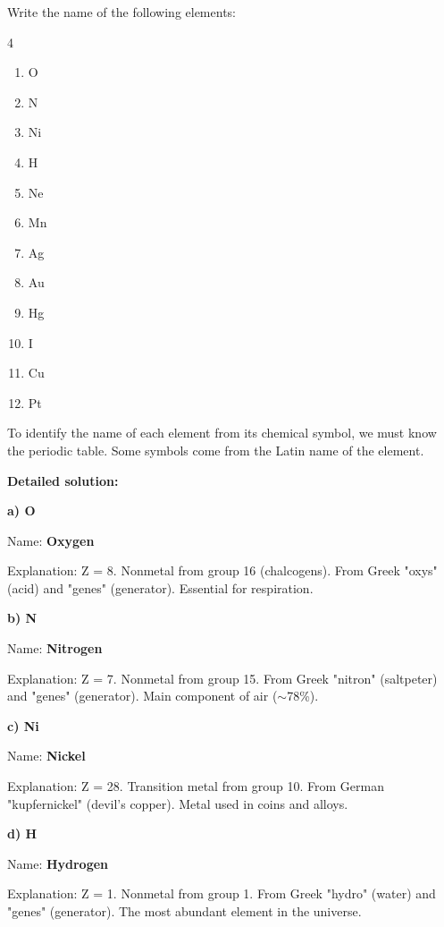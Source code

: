 \begin{exercise}
    Write the name of the following elements:
    \begin{multicols}{4}
        \begin{enumerate}[label=\letraminuscula]
        \item O
        \item N
        \item Ni
        \item H
        \item Ne
        \item Mn
        \item Ag
        \item Au
        \item Hg
        \item I
        \item Cu
        \item Pt
        \end{enumerate}
    \end{multicols}
    \begin{solu}
        To identify the name of each element from its chemical symbol, we must know the periodic table. Some symbols come from the Latin name of the element.

        \textbf{Detailed solution:}

        \textbf{a) O}

        Name: \textbf{Oxygen}

        Explanation: Z = 8. Nonmetal from group 16 (chalcogens). From Greek "oxys" (acid) and "genes" (generator). Essential for respiration.

        \textbf{b) N}

        Name: \textbf{Nitrogen}

        Explanation: Z = 7. Nonmetal from group 15. From Greek "nitron" (saltpeter) and "genes" (generator). Main component of air (\(\sim\)78\%).

        \textbf{c) Ni}

        Name: \textbf{Nickel}

        Explanation: Z = 28. Transition metal from group 10. From German "kupfernickel" (devil's copper). Metal used in coins and alloys.

        \textbf{d) H}

        Name: \textbf{Hydrogen}

        Explanation: Z = 1. Nonmetal from group 1. From Greek "hydro" (water) and "genes" (generator). The most abundant element in the universe.


\end{solu}
\end{exercise}
